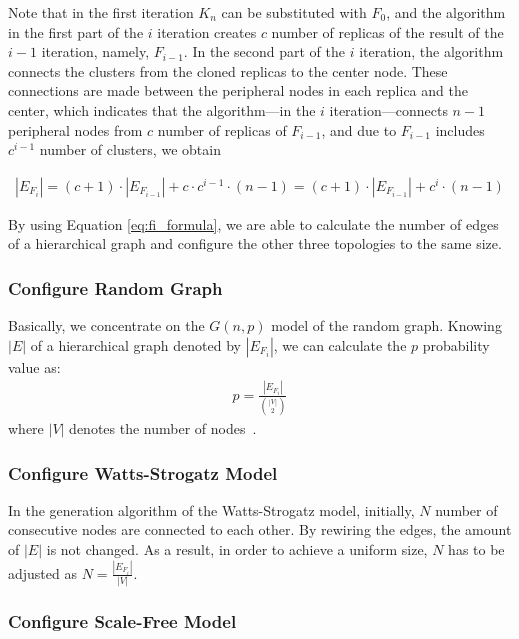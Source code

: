 Note that in the first iteration $K_n$ can be substituted with $F_0$, and the algorithm in the first part of the $i$ iteration creates $c$ number of replicas of the result of the $i-1$ iteration, namely, $F_{i-1}$. In the second part of the $i$ iteration, the algorithm connects the clusters from the cloned replicas to the center node. These connections are made between the peripheral nodes in each replica and the center, which indicates that the algorithm---in the $i$ iteration---connects $n-1$ peripheral nodes from $c$ number of replicas of $F_{i-1}$, and due to $F_{i-1}$ includes $c^{i-1}$ number of clusters, we obtain

\begin{align}\label{eq:fi_formula}
	|E_{F_i}| = (c+1) \cdot |E_{F_{i-1}}| + c \cdot c^{i-1} \cdot (n - 1)	= (c+1) \cdot |E_{F_{i-1}}| + c^i \cdot (n - 1)
\end{align}

By using Equation \ref{eq:fi_formula}, we are able to calculate the number of edges of a hierarchical graph and configure the other three topologies to the same size.

\subsubsection{Configure Random Graph}

Basically, we concentrate on the $G(n,p)$ model of the random graph. Knowing $|E|$ of a hierarchical graph denoted by $|E_{F_i}|$, we can calculate the $p$ probability value as:
\begin{align}
	p = \frac{|E_{F_i}|}{\binom{|V|}{2}}
\end{align}
where $|V|$ denotes the number of nodes~\cite{random_p}.

\subsubsection{Configure Watts-Strogatz Model}

In the generation algorithm of the Watts-Strogatz model, initially, $N$ number of consecutive nodes are connected to each other. By rewiring the edges, the amount of $|E|$ is not changed. As a result, in order to achieve a uniform size, $N$ has to be adjusted as $N = \frac{|E_{F_i}|}{|V|}$.

\subsubsection{Configure Scale-Free Model}

